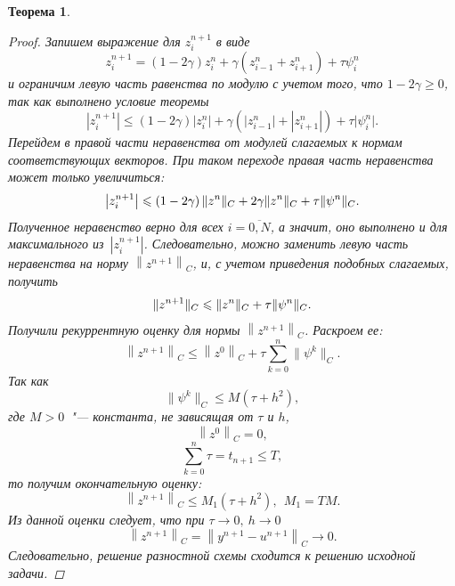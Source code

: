 \documentclass[11pt,a4paper,twoside]{report}
\numberwithin{equation}{section}
\theoremstyle{definition}
\theoremstyle{plain}
\newtheorem*{theorem*}{Теорема}
\DeclarePairedDelimiter\norm{\lVert}{\rVert}
\begin{document}
\begin{theorem*}
\begin{proof}
        Запишем выражение для $z_i^{n+1}$ в виде
        $$
            z_i^{n+1} = \left(1 - 2\gamma\right)z_i^n +
            \gamma\left(z_{i-1}^n + z_{i+1}^n\right) +
            \tau \psi_i^n
        $$
        и ограничим левую часть равенства по модулю с учетом того, что $1 - 2\gamma \geqslant 0$,
        так как выполнено условие теоремы
        $$
            \left|z_i^{n+1}\right|\leqslant\left(1-2\gamma\right)
            \big|z_i^n\big| + \gamma\left(\big|z_{i-1}^n\big| +
            \left|z_{i+1}^n\right|\right) + \tau \big|\psi_i^n\big|.
        $$
        Перейдем в правой части неравенства от модулей слагаемых к нормам
        соответствующих векторов. При таком переходе правая часть неравенства может
        только увеличиться:
        $$
            \left|z_i^{n+1}\right| \leqslant\left(1 - 2\gamma\right)
            \norm{z^n}_C + 2\gamma\norm{z^n}_C +
            \tau \norm{\psi^n}_C.
        $$
        Полученное неравенство верно для всех $i = \overline{0,N}$, а значит,
        оно выполнено и для максимального из~$\left|z_i^{n+1}\right|$.
        Следовательно,
        можно заменить левую часть неравенства на норму $\left\|z^{n+1}\right\|_C$, и,
        с учетом приведения подобных слагаемых, получить
        $$
            \norm{z^{n+1}}_C \leqslant \norm{z^n}_C+\tau\norm{\psi^n}_C.
        $$
        Получили рекуррентную оценку для нормы $\left\|z^{n+1}\right\|_C$.
        Раскроем ее:
        \begin{equation}
            \label{rek_score}
             \left\|z^{n+1}\right\|_C \leqslant \left\|z^0\right\|_C +
             \tau \sum_{k = 0}^n\big\|\psi^k\big\|_C.
        \end{equation}
        Так как
        $$
            \big\|\psi^k\big\|_C \leqslant M\left(\tau + h^2\right),
        $$
        где $M > 0$~"--- константа, не зависящая от $\tau$ и $h$,
        $$
            \left\|z^0\right\|_C = 0,
        $$
        $$
            \sum_{k = 0}^n\tau = t_{n+1} \leqslant T,
        $$
        то получим окончательную оценку:
        $$
            \left\|z^{n+1}\right\|_C \leqslant M_1\left(\tau + h^2\right),~~M_1=TM.
        $$
        Из данной оценки следует, что при $\tau \rightarrow 0,~h \rightarrow 0$
        $$
            \left\|z^{n+1}\right\|_C = \left\|y^{n+1}-u^{n+1}\right\|_C\rightarrow0.
        $$
        Следовательно, решение разностной схемы сходится к решению исходной задачи.


\end{proof}
\end{theorem*}
\end{document}
